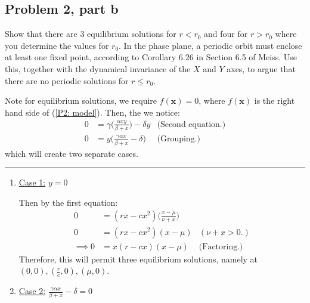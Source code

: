 \newpage
\subsection{Problem 2, part b}
Show that there are 3 equilibrium solutions for $r < r_0$ and four for $r > r_0$ where you determine the values for $r_0$. In the phase plane, a periodic orbit must enclose at least one fixed point, according to Corollary 6.26 in Section 6.5 of Meiss. Use this, together with the dynamical invariance of the $X$ and $Y$ axes, to argue that there are no periodic solutions for $r \leq r_0$.
\partbreak
\begin{solution}

    Note for equilibrium solutions, we require $f(\textbf{x}) = 0$, where $f(\textbf{x})$ is the right hand side of (\ref{P2: model}). Then, the we notice:
    \begin{align*}
        0&= \gamma \bigg( \frac{\alpha xy}{\beta + x}\bigg) - \delta y &\text{(Second equation.)}\\
       0 &= y\Bigg(\frac{\gamma \alpha x}{\beta + x} - \delta\Bigg) &\text{(Grouping.)}
    \end{align*}
    which will create two separate cases. 
    \hrule
    \begin{enumerate}
        \item \underline{Case 1:} $y = 0$

        Then by the first equation:
        \tightalignbreak
        \begin{align*}
            0 &=(rx - cx^2)\bigg(\frac{x - \mu}{\nu + x}\bigg)\\
            0 &= (rx - cx^2)(x - \mu) &(\nu + x > 0.)\\
            \implies 0 &= x(r - cx)(x - \mu) &\text{(Factoring.)}
        \end{align*}
        \alignbreak
        Therefore, this will permit three equilibrium solutions, namely at $(0, 0), (\frac{r}{c}, 0), (\mu, 0)$.
        \newpage
        \item \underline{Case 2:} $\frac{\gamma \alpha x}{\beta + x} - \delta = 0$


\end{enumerate}
\end{solution}
